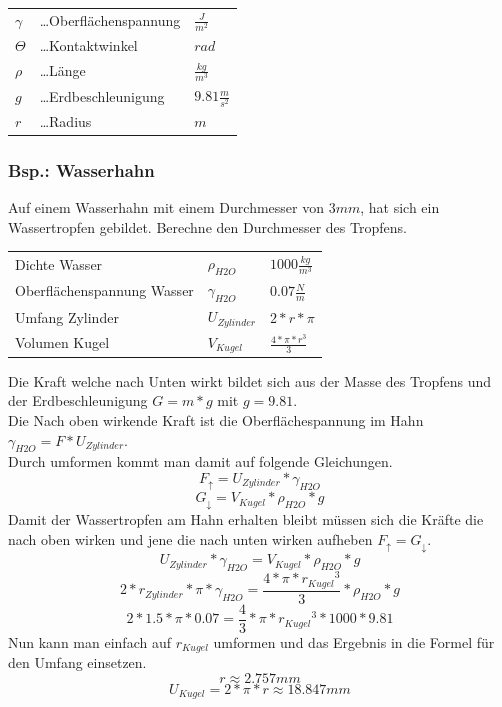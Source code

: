 \documentclass[a4paper,11pt]{article}
\begin{document}
\begin{center}
    \begin{tabular}{l l l}
        $\gamma$ &\dots Oberflächenspannung & $\frac{J}{m^2}$\\
        $\Theta$ &\dots Kontaktwinkel & $rad$\\
        $\rho$ &\dots Länge & $\frac{kg}{m^3}$\\
        $g$ &\dots Erdbeschleunigung & $9.81\frac{m}{s^2}$\\
        $r$ &\dots Radius & $m$
    \end{tabular}
\end{center}

\newpage
\subsubsection{Bsp.: Wasserhahn}
Auf einem Wasserhahn mit einem Durchmesser von $3mm$, hat sich ein Wassertropfen gebildet.
Berechne den Durchmesser des Tropfens.
\begin{center}
    \begin{tabular}{l l l}
        Dichte Wasser & $\rho_{H2O}$ & $1000 \frac{kg}{m^3}$\\
        Oberflächenspannung Wasser & $\gamma_{H2O}$ & $0.07 \frac{N}{m}$\\
        Umfang Zylinder & $U_{Zylinder}$ & $2*r*\pi$\\
        Volumen Kugel & $V_{Kugel}$ & $\frac{4*\pi*r^3}{3}$
    \end{tabular}
\end{center}
Die Kraft welche nach Unten wirkt bildet sich aus der Masse des Tropfens und der Erdbeschleunigung $G = m*g$ mit $g = 9.81$.
\vspace{0.8 em}\\
Die Nach oben wirkende Kraft ist die Oberflächespannung im Hahn $\gamma_{H2O} = F * U_{Zylinder}$.
\vspace{0.8 em}\\
Durch umformen kommt man damit auf folgende Gleichungen.
$$F_\uparrow = U_{Zylinder} * \gamma_{H2O}$$
$$G_\downarrow = V_{Kugel} * \rho_{H2O} * g$$
Damit der Wassertropfen am Hahn erhalten bleibt müssen sich die Kräfte die nach oben wirken und jene die nach unten wirken aufheben $F_\uparrow = G_\downarrow$.
$$U_{Zylinder} * \gamma_{H2O} = V_{Kugel} * \rho_{H2O} * g$$
$$2*r_{Zylinder}*\pi * \gamma_{H2O} = \frac{4*\pi*{r_{Kugel}}^3}{3} * \rho_{H2O} * g$$
$$2*1.5*\pi*0.07 = \frac{4}{3}*\pi*{r_{Kugel}}^3 * 1000 * 9.81$$
Nun kann man einfach auf $r_{Kugel}$ umformen und das Ergebnis in die Formel für den Umfang einsetzen.
$$r \approx 2.757mm$$
$$U_{Kugel} = 2*\pi*r \approx 18.847mm$$
\end{document}
